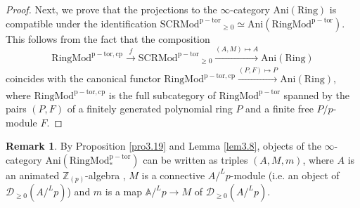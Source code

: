 \documentclass[11pt, a4paper]{amsart}
\theoremstyle{plain}
\theoremstyle{definition}
\newtheorem{remark}[theorem]{Remark}
\begin{document}
\begin{proof}
    Next, we prove that the projections to the $\infty$-category $\operatorname{Ani(Ring)}$ is compatible under the identification $\operatorname{SCRMod^{p-tor}}_{\ge0}\simeq \operatorname{Ani(RingMod^{p-tor})}$. This follows from the fact that the composition \[\operatorname{RingMod^{p-tor,cp}}\xrightarrow[]{f}\operatorname{SCRMod^{p-tor}}_{\ge0}\xrightarrow[]{(A,M)\mapsto A}\operatorname{Ani(Ring)}\] coincides with the canonical functor $\operatorname{RingMod^{p-tor,cp}}\xrightarrow[]{(P,F)\mapsto P}\operatorname{Ani(Ring)}$, where $\operatorname{RingMod^{p-tor,cp}}$ is the full subcategory of $\operatorname{RingMod^{p-tor}}$ spanned by the pairs $(P,F)$ of a finitely generated polynomial ring $P$ and a finite free $P/p$-module $F$.
\end{proof}

\begin{remark}\label{rem3.20}
    By Proposition \ref{pro3.19} and Lemma \ref{lem3.8}, objects of the $\infty$-category $\operatorname{Ani(RingMod_*^{p-tor})}$ can be written as triples $(A,M,m)$, where $A$ is an animated $\mathbb Z_{(p)}$-algebra , $M$ is a connective $A/^Lp$-module (i.e. an object of $\mathcal D_{\ge 0}(A/^Lp)$) and $m$ is a map $\mathbb A/^Lp\to M$ of $\mathcal D_{\ge 0}(A/^Lp)$.
\end{remark}
\end{document}

